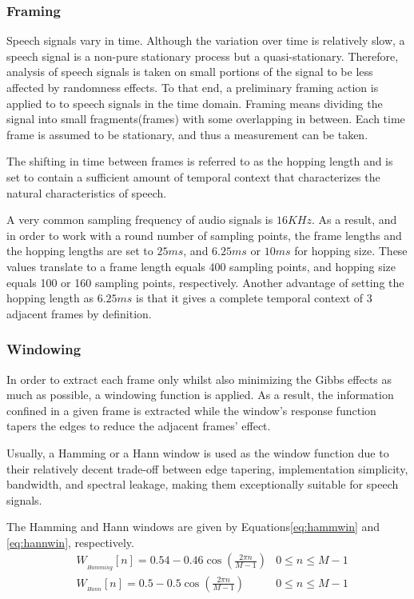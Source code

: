\subsubsection{Framing}
Speech signals vary in time. 
Although the variation over time is relatively slow, 
a speech signal is a non-pure stationary process 
but a quasi-stationary. 
Therefore, analysis of speech signals 
is taken on small portions of the 
signal to be less affected by randomness effects.
To that end, a preliminary framing action is applied
to to speech signals in the time domain.
Framing means dividing the signal 
into small fragments(frames) with some overlapping in between.
Each time frame is assumed to be stationary,
and thus a measurement can be taken.

The shifting in time between frames is referred
to as the hopping length and is set to contain 
a sufficient amount of temporal
context that characterizes the natural
characteristics of speech.

A very common sampling frequency of audio signals
is \(16KHz\). 
As a result, and in order to work with 
a round number of sampling points, 
the frame lengths 
and the hopping lengths 
are set to \(25ms\), and 
\(6.25ms\) or \(10ms\) for hopping size. 
These values translate to a frame length
equals 400 sampling points, and hopping size
equals 100 or 160 sampling points, respectively.
Another advantage of setting the hopping length
as \(6.25ms\) is that it gives
a complete temporal context of 3 adjacent frames
by definition.

\subsubsection{Windowing}
In order to extract each frame only 
whilst also minimizing the Gibbs effects as much as possible,
a windowing function is applied.
As a result, the information confined 
in a given frame is extracted while the 
window's response function tapers 
the edges to reduce the adjacent frames' effect.

Usually, a Hamming or a Hann window 
is used as the window function due to their 
relatively decent trade-off between edge tapering, 
implementation simplicity, bandwidth, and spectral leakage, 
making them exceptionally suitable for speech signals.

The Hamming and Hann windows are given by
Equations\;\ref{eq:hammwin} and \ref{eq:hannwin}, respectively.
\begin{align}
    \label{eq:hammwin} &W_{_{Hamming}}[n] = 0.54 - 0.46
    \cos\left( \frac{2\pi n}{M-1} \right) &
            0 \leq n \leq M - 1 \\
    \label{eq:hannwin} &W_{_{Hann}}[n] = 0.5 - 0.5
            \cos\left( \frac{2\pi n}{M-1} \right) &
            0 \leq n \leq M - 1
\end{align}

